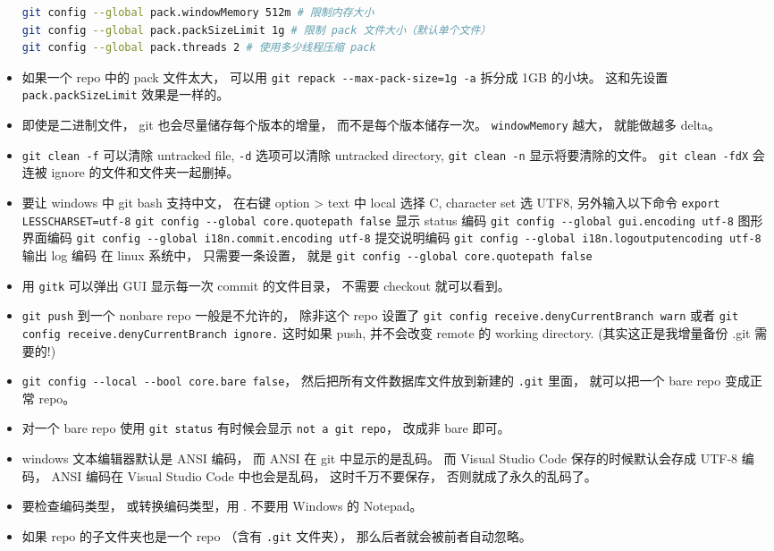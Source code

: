 \begin{itemize}
\begin{lstlisting}[language=bash]
git config --global pack.windowMemory 512m # 限制内存大小
git config --global pack.packSizeLimit 1g # 限制 pack 文件大小（默认单个文件）
git config --global pack.threads 2 # 使用多少线程压缩 pack
\end{lstlisting}
\item 如果一个 repo 中的 pack 文件太大， 可以用 \verb`git repack --max-pack-size=1g -a` 拆分成 1GB 的小块。 这和先设置 \verb`pack.packSizeLimit` 效果是一样的。
\item 即使是二进制文件， git 也会尽量储存每个版本的增量， 而不是每个版本储存一次。 \verb`windowMemory` 越大， 就能做越多 delta。
\item \verb`git clean -f` 可以清除 untracked file, \verb`-d` 选项可以清除 untracked directory,  \verb`git clean -n` 显示将要清除的文件。 \verb`git clean -fdX` 会连被 ignore 的文件和文件夹一起删掉。
\item 要让 windows 中 git bash 支持中文， 在右键 option > text 中 local 选择 C, character set 选 UTF8, 另外输入以下命令
\verb`export LESSCHARSET=utf-8`
\verb`git config --global core.quotepath false`     显示 status 编码
\verb`git config --global gui.encoding utf-8`    图形界面编码
\verb`git config --global i18n.commit.encoding utf-8`   提交说明编码
\verb`git config --global i18n.logoutputencoding utf-8` 输出 log 编码
在 linux 系统中， 只需要一条设置， 就是
\verb`git config --global core.quotepath false`
\item 用 \verb`gitk` 可以弹出 GUI 显示每一次 commit 的文件目录， 不需要 checkout 就可以看到。
\item \verb`git push` 到一个 nonbare repo 一般是不允许的， 除非这个 repo 设置了 \verb`git config receive.denyCurrentBranch warn` 或者 \verb`git config receive.denyCurrentBranch ignore.` 这时如果 push, 并不会改变 remote 的 working directory. (其实这正是我增量备份 .git 需要的!)
\item \verb`git config --local --bool core.bare false`， 然后把所有文件数据库文件放到新建的 \verb`.git` 里面， 就可以把一个 bare repo 变成正常 repo。
\item 对一个 bare repo 使用 \verb`git status` 有时候会显示 \verb`not a git repo`， 改成非 bare 即可。
\item windows 文本编辑器默认是 ANSI 编码， 而 ANSI 在 git 中显示的是乱码。 而 Visual Studio Code 保存的时候默认会存成 UTF-8 编码， ANSI 编码在 Visual Studio Code 中也会是乱码， 这时千万不要保存， 否则就成了永久的乱码了。
\item 要检查编码类型， 或转换编码类型，用 . 不要用 Windows 的 Notepad。
\item 如果 repo 的子文件夹也是一个 repo （含有 \verb`.git` 文件夹）， 那么后者就会被前者自动忽略。
\end{itemize}

